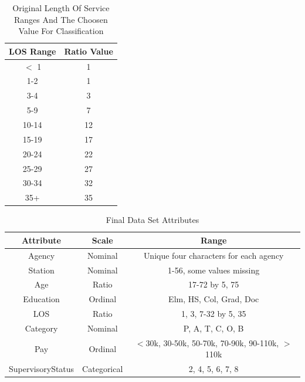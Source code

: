 \documentclass{article}
\begin{document}
    \begin{center}
        \begin{table}
            \centering
            \begin{tabular}{ |c|c| }
                \hline
                LOS Range & Ratio Value \\
                \hline
                $<$ 1 & 1 \\
                1-2 & 1 \\
                3-4 & 3 \\
                5-9 & 7 \\
                10-14 & 12 \\
                15-19 & 17 \\
                20-24 & 22 \\
                25-29 & 27 \\
                30-34 & 32 \\
                35+ & 35 \\
                \hline
            \end{tabular}
            \caption{Original Length Of Service Ranges And The Choosen Value For Classification}
            \label{tab:4}
        \end{table}
    \end{center}

    \begin{center}
        \begin{table}
            \centering
            \begin{tabular}{ |c|c|c| }
                \hline
                Attribute & Scale & Range \\
                \hline
                Agency & Nominal & Unique four characters for each agency \\
                Station & Nominal & 1-56, some values missing \\
                Age & Ratio & 17-72 by 5, 75 \\
                Education & Ordinal & Elm, HS, Col, Grad, Doc \\
                LOS & Ratio & 1, 3, 7-32 by 5, 35 \\
                Category & Nominal & P, A, T, C, O, B \\
                Pay & Ordinal & $<$30k, 30-50k, 50-70k, 70-90k, 90-110k, $>$110k \\
                SupervisoryStatus & Categorical & 2, 4, 5, 6, 7, 8 \\
                \hline
            \end{tabular}
            \caption{Final Data Set Attributes}
            \label{tab:5}
        \end{table}
    \end{center}
\end{document}
